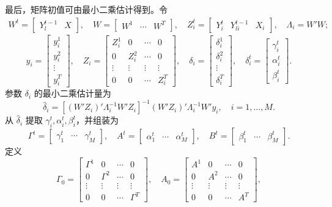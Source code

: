 最后，矩阵初值可由最小二乘估计得到。令
\[
\begin{gathered}
W^t=\begin{bmatrix}Y_l^{t-1}&X\end{bmatrix},\quad
W=\begin{bmatrix}W^1&\cdots&W^T\end{bmatrix},\quad
Z_i^t=\begin{bmatrix}Y_i^t&Y_{li}^{t-1}&X_i\end{bmatrix},\quad
\Lambda_i=W'W;
\end{gathered}
\]
\[
y_i=\begin{bmatrix}y_i^1\\y_i^2\\\vdots\\y_i^T\end{bmatrix},\quad
Z_i=\begin{bmatrix}Z_i^1&0&\cdots&0\\0&Z_i^2&\cdots&0\\\vdots&\vdots&\vdots&\vdots\\0&0&\cdots&Z_i^T\end{bmatrix},\quad
\delta_i=\begin{bmatrix}\delta_i^1\\\delta_i^2\\\vdots\\\delta_i^T\end{bmatrix},\quad
\delta_i^t=\begin{bmatrix}\gamma_i^t\\\alpha_i^t\\\beta_i^t\end{bmatrix}.
\]
参数 $\delta_i$ 的最小二乘估计量为
\begin{equation}
\widehat\delta_i=[(W'Z_i)'\Lambda_i^{-1}W'Z_i]^{-1}
(W'Z_i)'\Lambda_i^{-1}W'y_i,\quad i=1,\ldots,M.\tag{4.G.28}
\end{equation}
从 $\widehat\delta_i$ 提取 $\gamma_i^t,\alpha_i^t,\beta_i^t$，并组装为
\[
\Gamma^t=\begin{bmatrix}\gamma_1^t&\cdots&\gamma_M^t\end{bmatrix},\quad
A^t=\begin{bmatrix}\alpha_1^t&\cdots&\alpha_M^t\end{bmatrix},\quad
B^t=\begin{bmatrix}\beta_1^t&\cdots&\beta_M^t\end{bmatrix}.
\]
定义
\[
\Gamma_0=\begin{bmatrix}\Gamma^1&0&\cdots&0\\0&\Gamma^2&\cdots&0\\\vdots&\vdots&\vdots&\vdots\\0&0&\cdots&\Gamma^T\end{bmatrix},\quad
A_0=\begin{bmatrix}A^1&0&\cdots&0\\0&A^2&\cdots&0\\\vdots&\vdots&\vdots&\vdots\\0&0&\cdots&A^T\end{bmatrix},
\]
